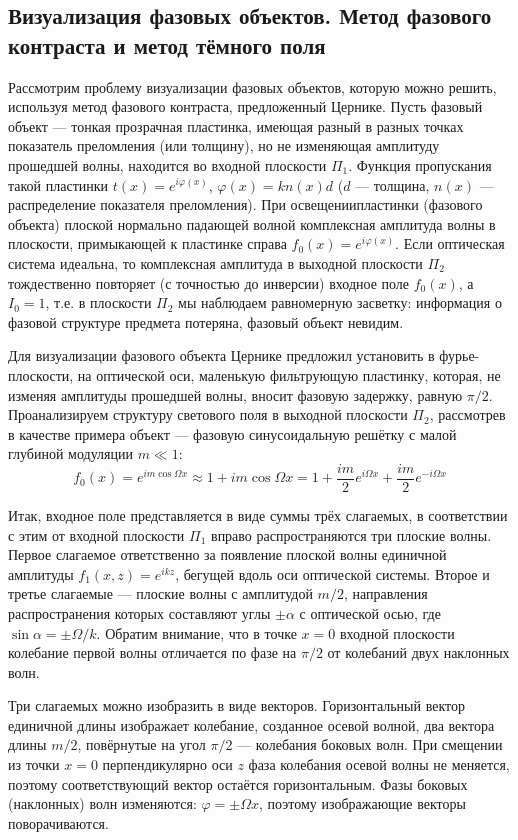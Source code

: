 \subsection{Визуализация фазовых объектов. Метод фазового контраста и метод тёмного поля}
Рассмотрим проблему визуализации фазовых объектов, которую
можно решить, используя метод фазового контраста, предложенный
Цернике. Пусть фазовый объект --- тонкая прозрачная пластинка, имеющая разный в разных точках показатель преломления (или толщину),
но не изменяющая амплитуду прошедшей волны, находится во входной плоскости $\Pi_1$.
Функция пропускания такой пластинки $t(x) = e^{i\varphi(x)}$, $\varphi(x) = kn(x)d$ ($d$ --- толщина,
$n(x)$ --- распределение показателя преломления). При освещениипластинки (фазового объекта) плоской нормально падающей волной
комплексная амплитуда волны в плоскости, примыкающей к пластинке справа $f_0(x) = e^{i\varphi(x)}$.
 Если оптическая система идеальна, то комплексная амплитуда в выходной плоскости $\Pi_2$
  тождественно повторяет (с точностью до инверсии) входное поле $f_0(x)$,  а $I_0 = 1$,
  т.е. в плоскости $\Pi_2$ мы наблюдаем равномерную засветку: информация о фазовой структуре предмета потеряна, фазовый объект невидим.

Для визуализации фазового объекта Цернике предложил установить в фурье-плоскости, на оптической оси, маленькую фильтрующую
пластинку, которая, не изменяя амплитуды прошедшей волны, вносит фазовую задержку, равную $\pi / 2$.
Проанализируем структуру светового поля в выходной плоскости $\Pi_2$, рассмотрев в качестве примера объект --- фазовую синусоидальную решётку с малой глубиной модуляции
$m \ll 1$:
\[
f_0(x) = e^{im\cos\Omega x} \approx 1 + im\cos\Omega x = 1 + \frac{im}{2}e^{i\Omega x} + \frac{im}{2}e^{-i\Omega x}
\]

Итак, входное поле представляется в виде суммы трёх слагаемых, в соответствии с этим от входной плоскости
$\Pi_1$ вправо распространяются три плоские волны. Первое слагаемое ответственно за появление
плоской волны единичной амплитуды $f_1(x, z) = e^{ikz}$, бегущей вдоль оси оптической системы.
 Второе и третье слагаемые --- плоские волны с амплитудой $m/2$, направления распространения которых составляют углы
$\pm\alpha$  с оптической осью, где $\sin\alpha = \pm\Omega/k$. Обратим внимание, что в точке
$x = 0$ входной плоскости колебание первой волны отличается по фазе на $\pi /2$  от колебаний двух наклонных волн.

Три слагаемых можно изобразить в виде векторов. Горизонтальный вектор единичной длины изображает колебание, созданное осевой волной, два вектора длины
$m/2$, повёрнутые на угол $\pi/2$ --- колебания боковых волн. При смещении из точки $x=0$
перпендикулярно оси $z$ фаза колебания осевой волны не меняется, поэтому соответствующий вектор остаётся горизонтальным.
Фазы боковых (наклонных) волн изменяются: $\varphi = \pm\Omega x$, поэтому изображающие векторы поворачиваются.

